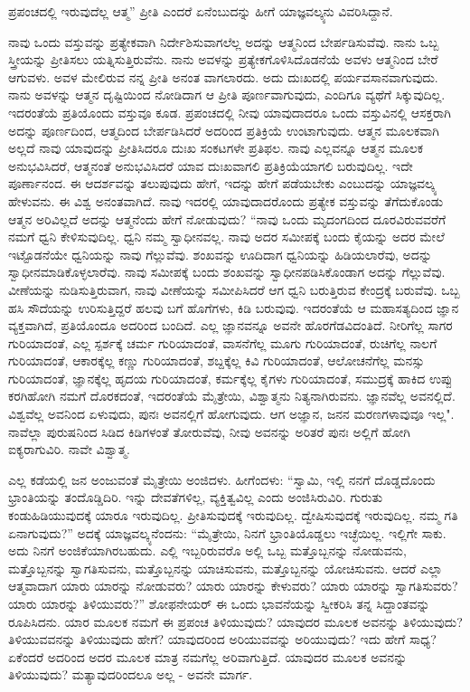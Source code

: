 ಪ್ರಪಂಚದಲ್ಲಿ ಇರುವುದೆಲ್ಲ ಆತ್ಮ” ಪ್ರೀತಿ ಎಂದರೆ ಏನೆಂಬುದನ್ನು ಹೀಗೆ ಯಾಜ್ಞವಲ್ಕ್ಯನು ವಿವರಿಸಿದ್ದಾನೆ.

ನಾವು ಒಂದು ವಸ್ತುವನ್ನು ಪ್ರತ್ಯೇಕವಾಗಿ ನಿರ್ದೇಶಿಸುವಾಗಲೆಲ್ಲ ಅದನ್ನು ಆತ್ಮನಿಂದ ಬೇರ್ಪಡಿಸುವೆವು. ನಾನು ಒಬ್ಬ ಸ್ತ್ರೀಯನ್ನು ಪ್ರೀತಿಸಲು ಯತ್ನಿಸುತ್ತಿರುವೆನು. ನಾನು ಅವಳನ್ನು ಪ್ರತ್ಯೇಕಗೊಳಿಸಿದೊಡನೆಯೆ ಅವಳು ಆತ್ಮನಿಂದ ಬೇರೆ ಆಗುವಳು. ಅವಳ ಮೇಲಿರುವ ನನ್ನ ಪ್ರೀತಿ ಅನಂತ ವಾಗಲಾರದು. ಅದು ದುಃಖದಲ್ಲಿ ಪರ್ಯವಸಾನವಾಗುವುದು. ನಾನು ಅವಳನ್ನು ಆತ್ಮನ ದೃಷ್ಟಿಯಿಂದ ನೋಡಿದಾಗ ಆ ಪ್ರೀತಿ ಪೂರ್ಣವಾಗುವುದು, ಎಂದಿಗೂ ವ್ಯಥೆಗೆ ಸಿಕ್ಕುವುದಿಲ್ಲ. ಇದರಂತೆಯೆ ಪ್ರತಿಯೊಂದು ವಸ್ತುವೂ ಕೂಡ. ಪ್ರಪಂಚದಲ್ಲಿ ನೀವು ಯಾವುದಾದರೂ ಒಂದು ವಸ್ತುವಿನಲ್ಲಿ ಆಸಕ್ತರಾಗಿ ಅದನ್ನು ಪೂರ್ಣದಿಂದ, ಆತ್ಮದಿಂದ ಬೇರ್ಪಡಿಸಿದರೆ ಅದರಿಂದ ಪ್ರತಿಕ್ರಿಯೆ ಉಂಟಾಗುವುದು. ಆತ್ಮನ ಮೂಲಕವಾಗಿ ಅಲ್ಲದೆ ನಾವು ಯಾವುದನ್ನು ಪ್ರೀತಿಸಿದರೂ ದುಃಖ ಸಂಕಟಗಳೇ ಪ್ರತಿಫಲ. ನಾವು ಎಲ್ಲವನ್ನೂ ಆತ್ಮನ ಮೂಲಕ ಅನುಭವಿಸಿದರೆ, ಆತ್ಮನಂತೆ ಅನುಭವಿಸಿದರೆ ಯಾವ ದುಃಖವಾಗಲಿ ಪ್ರತಿಕ್ರಿಯೆಯಾಗಲಿ ಬರುವುದಿಲ್ಲ. ಇದೇ ಪೂರ್ಣಾನಂದ. ಈ ಆದರ್ಶವನ್ನು ತಲುಪುವುದು ಹೇಗೆ, ಇದನ್ನು ಹೇಗೆ ಪಡೆಯಬೇಕು ಎಂಬುದನ್ನು ಯಾಜ್ಞವಲ್ಕ್ಯ ಹೇಳುವನು. ಈ ವಿಶ್ವ ಅನಂತವಾಗಿದೆ. ನಾವು ಇದರಲ್ಲಿ ಯಾವುದಾದರೊಂದು ಪ್ರತ್ಯೇಕ ವಸ್ತುವನ್ನು ತೆಗೆದುಕೊಂಡು ಆತ್ಮನ ಅರಿವಿಲ್ಲದೆ ಅದನ್ನು ಆತ್ಮನೆಂದು ಹೇಗೆ ನೋಡುವುದು? “ನಾವು ಒಂದು ಮೃದಂಗದಿಂದ ದೂರವಿರುವವರೆಗೆ ನಮಗೆ ಧ್ವನಿ ಕೇಳಿಸುವುದಿಲ್ಲ. ಧ್ವನಿ ನಮ್ಮ ಸ್ವಾಧೀನವಲ್ಲ. ನಾವು ಅದರ ಸಮೀಪಕ್ಕೆ ಬಂದು ಕೈಯನ್ನು ಅದರ ಮೇಲೆ ಇಟ್ಟೊಡನೆಯೇ ಧ್ವನಿಯನ್ನು ನಾವು ಗೆಲ್ಲುವೆವು. ಶಂಖವನ್ನು ಊದಿದಾಗ ಧ್ವನಿಯನ್ನು ಹಿಡಿಯಲಾರೆವು, ಅದನ್ನು ಸ್ವಾಧೀನಮಾಡಿಕೊಳ್ಳಲಾರೆವು. ನಾವು ಸಮೀಪಕ್ಕೆ ಬಂದು ಶಂಖವನ್ನು ಸ್ವಾಧೀನಪಡಿಸಿಕೊಂಡಾಗ ಅದನ್ನು ಗೆಲ್ಲುವೆವು. ವೀಣೆಯನ್ನು ನುಡಿಸುತ್ತಿರುವಾಗ, ನಾವು ವೀಣೆಯನ್ನು ಸಮೀಪಿಸಿದರೆ ಆಗ ಧ್ವನಿ ಬರುತ್ತಿರುವ ಕೇಂದ್ರಕ್ಕೆ ಬರುವೆವು. ಒಬ್ಬ ಹಸಿ ಸೌದೆಯನ್ನು ಉರಿಸುತ್ತಿದ್ದರೆ ಹಲವು ಬಗೆ ಹೊಗೆಗಳು, ಕಿಡಿ ಬರುವುವು. ಇದರಂತೆಯೆ ಆ ಮಹಾಸತ್ಯದಿಂದ ಜ್ಞಾನ ವ್ಯಕ್ತವಾಗಿದೆ, ಪ್ರತಿಯೊಂದೂ ಅದರಿಂದ ಬಂದಿದೆ. ಎಲ್ಲ ಜ್ಞಾನವನ್ನೂ ಅವನೇ ಹೊರಗೆಡವಿದಂತಿದೆ. ನೀರಿಗೆಲ್ಲ ಸಾಗರ ಗುರಿಯಾದಂತೆ, ಎಲ್ಲ ಸ್ಪರ್ಶಕ್ಕೆ ಚರ್ಮ ಗುರಿಯಾದಂತೆ, ವಾಸನೆಗೆಲ್ಲ ಮೂಗು ಗುರಿಯಾದಂತೆ, ರುಚಿಗೆಲ್ಲ ನಾಲಗೆ ಗುರಿಯಾದಂತೆ, ಆಕಾರಕ್ಕೆಲ್ಲ ಕಣ್ಣು ಗುರಿಯಾದಂತೆ, ಶಬ್ದಕ್ಕೆಲ್ಲ ಕಿವಿ ಗುರಿಯಾದಂತೆ, ಆಲೋಚನೆಗೆಲ್ಲ ಮನಸ್ಸು ಗುರಿಯಾದಂತೆ, ಜ್ಞಾನಕ್ಕೆಲ್ಲ ಹೃದಯ ಗುರಿಯಾದಂತೆ, ಕರ್ಮಕ್ಕೆಲ್ಲ ಕೈಗಳು ಗುರಿಯಾದಂತೆ, ಸಮುದ್ರಕ್ಕೆ ಹಾಕಿದ ಉಪ್ಪು ಕರಗಿಹೋಗಿ ನಮಗೆ ದೊರಕದಂತೆ, ಇದರಂತೆಯೆ ಮೈತ್ರೇಯಿ, ವಿಶ್ವಾತ್ಮನು ನಿತ್ಯನಾಗಿರುವನು. ಜ್ಞಾನವೆಲ್ಲ ಅವನಲ್ಲಿದೆ. ವಿಶ್ವವೆಲ್ಲ ಅವನಿಂದ ಏಳುವುದು, ಪುನಃ ಅವನಲ್ಲಿಗೆ ಹೋಗುವುದು. ಆಗ ಅಜ್ಞಾನ, ಜನನ ಮರಣಗಳಾವುವೂ ಇಲ್ಲ". ನಾವೆಲ್ಲಾ ಪುರುಷನಿಂದ ಸಿಡಿದ ಕಿಡಿಗಳಂತೆ ತೋರುವೆವು, ನೀವು ಅವನನ್ನು ಅರಿತರೆ ಪುನಃ ಅಲ್ಲಿಗೆ ಹೋಗಿ ಐಕ್ಯರಾಗುವಿರಿ. ನಾವೇ ವಿಶ್ವಾತ್ಮ.

ಎಲ್ಲ ಕಡೆಯಲ್ಲಿ ಜನ ಅಂಜುವಂತೆ ಮೈತ್ರೇಯಿ ಅಂಜಿದಳು. ಹೀಗೆಂದಳು: “ಸ್ವಾಮಿ, ಇಲ್ಲಿ ನನಗೆ ದೊಡ್ಡದೊಂದು ಭ್ರಾಂತಿಯನ್ನು ತಂದೊಡ್ಡಿದಿರಿ. ಇನ್ನು ದೇವತೆಗಳಿಲ್ಲ, ವ್ಯಕ್ತಿತ್ವವಿಲ್ಲ ಎಂದು ಅಂಜಿಸಿರುವಿರಿ. ಗುರುತು ಕಂಡುಹಿಡಿಯುವುದಕ್ಕೆ ಯಾರೂ ಇರುವುದಿಲ್ಲ. ಪ್ರೀತಿಸುವುದಕ್ಕೆ ಇರುವುದಿಲ್ಲ. ದ್ವೇಷಿಸುವುದಕ್ಕೆ ಇರುವುದಿಲ್ಲ. ನಮ್ಮ ಗತಿ ಏನಾಗುವುದು?'' ಅದಕ್ಕೆ ಯಾಜ್ಞವಲ್ಕ್ಯನೆಂದನು: “ಮೈತ್ರೇಯಿ, ನಿನಗೆ ಭ್ರಾಂತಿಯೊಡ್ಡಲು ಇಚ್ಛೆಯಿಲ್ಲ. ಇಲ್ಲಿಗೇ ಸಾಕು. ಅದು ನಿನಗೆ ಅಂಜಿಕೆಯಾಗಿರಬಹುದು. ಎಲ್ಲಿ ಇಬ್ಬರಿರುವರೊ ಅಲ್ಲಿ ಒಬ್ಬ ಮತ್ತೊಬ್ಬನನ್ನು ನೋಡುವನು, ಮತ್ತೊಬ್ಬನನ್ನು ಸ್ವಾಗತಿಸುವನು, ಮತ್ತೊಬ್ಬನನ್ನು ಯಾಚಿಸುವನು, ಮತ್ತೊಬ್ಬನನ್ನು ಯೋಚಿಸುವನು. ಆದರೆ ಎಲ್ಲಾ ಆತ್ಮವಾದಾಗ ಯಾರು ಯಾರನ್ನು ನೋಡುವರು? ಯಾರು ಯಾರನ್ನು ಕೇಳುವರು? ಯಾರು ಯಾರನ್ನು ಸ್ವಾಗತಿಸುವರು? ಯಾರು ಯಾರನ್ನು ತಿಳಿಯುವರು?” ಶೋಫನೇಯರ್ ಈ ಒಂದು ಭಾವನೆಯನ್ನು ಸ್ವೀಕರಿಸಿ ತನ್ನ ಸಿದ್ದಾಂತವನ್ನು ರೂಪಿಸಿದನು. ಯಾರ ಮೂಲಕ ನಮಗೆ ಈ ಪ್ರಪಂಚ ತಿಳಿಯುವುದು? ಯಾವುದರ ಮೂಲಕ ಅವನನ್ನು ತಿಳಿಯುವುದು? ತಿಳಿಯುವವನನ್ನು ತಿಳಿಯುವುದು ಹೇಗೆ? ಯಾವುದರಿಂದ ಅರಿಯುವವನ್ನು ಅರಿಯುವುದು? ಇದು ಹೇಗೆ ಸಾಧ್ಯ? ಏಕೆಂದರೆ ಅದರಿಂದ ಅದರ ಮೂಲಕ ಮಾತ್ರ ನಮಗೆಲ್ಲ ಅರಿವಾಗುತ್ತಿದೆ. ಯಾವುದರ ಮೂಲಕ ಅವನನ್ನು ತಿಳಿಯುವುದು? ಮತ್ಯಾವುದರಿಂದಲೂ ಅಲ್ಲ - ಅವನೇ ಮಾರ್ಗ.

